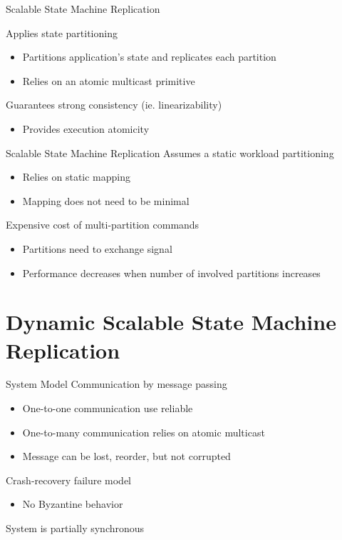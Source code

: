 \documentclass[10pt]{beamer}
\begin{document}
\begin{frame}[fragile]{Scalable State Machine Replication}

  Applies state partitioning
  \begin{itemize}
    \item Partitions application's state and replicates each partition
    \item Relies on an atomic multicast primitive %
  \end{itemize}

  Guarantees strong consistency (ie. linearizability)
  \begin{itemize}
    \item Provides execution atomicity
  \end{itemize}

  
\end{frame}

\begin{frame}[fragile]{Scalable State Machine Replication}
  Assumes a static workload partitioning
  \begin{itemize}
    \item Relies on static mapping
    \item Mapping does not need to be minimal
  \end{itemize}
  Expensive cost of multi-partition commands
  \begin{itemize}
    \item Partitions need to exchange signal
    \item Performance decreases when number of involved partitions increases
  \end{itemize}
  
\end{frame}

\section{Dynamic Scalable State Machine Replication}

\begin{frame}{System Model}
  Communication by message passing
  \begin{itemize}
    \item One-to-one communication use reliable 
    \item One-to-many communication relies on atomic multicast
    \item Message can be lost, reorder, but not corrupted
  \end{itemize}
  Crash-recovery failure model
  \begin{itemize}
    \item No Byzantine behavior
  \end{itemize}
  System is partially synchronous
\end{frame}
\end{document}

